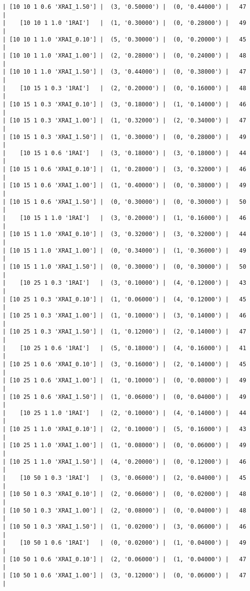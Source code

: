 \documentclass{article}
\begin{document}
\begin{verbatim}
| [10 10 1 0.6 'XRAI_1.50'] |  (3, '0.50000') |  (0, '0.44000') |   47  |
|    [10 10 1 1.0 '1RAI']   |  (1, '0.30000') |  (0, '0.28000') |   49  |
| [10 10 1 1.0 'XRAI_0.10'] |  (5, '0.30000') |  (0, '0.20000') |   45  |
| [10 10 1 1.0 'XRAI_1.00'] |  (2, '0.28000') |  (0, '0.24000') |   48  |
| [10 10 1 1.0 'XRAI_1.50'] |  (3, '0.44000') |  (0, '0.38000') |   47  |
|    [10 15 1 0.3 '1RAI']   |  (2, '0.20000') |  (0, '0.16000') |   48  |
| [10 15 1 0.3 'XRAI_0.10'] |  (3, '0.18000') |  (1, '0.14000') |   46  |
| [10 15 1 0.3 'XRAI_1.00'] |  (1, '0.32000') |  (2, '0.34000') |   47  |
| [10 15 1 0.3 'XRAI_1.50'] |  (1, '0.30000') |  (0, '0.28000') |   49  |
|    [10 15 1 0.6 '1RAI']   |  (3, '0.18000') |  (3, '0.18000') |   44  |
| [10 15 1 0.6 'XRAI_0.10'] |  (1, '0.28000') |  (3, '0.32000') |   46  |
| [10 15 1 0.6 'XRAI_1.00'] |  (1, '0.40000') |  (0, '0.38000') |   49  |
| [10 15 1 0.6 'XRAI_1.50'] |  (0, '0.30000') |  (0, '0.30000') |   50  |
|    [10 15 1 1.0 '1RAI']   |  (3, '0.20000') |  (1, '0.16000') |   46  |
| [10 15 1 1.0 'XRAI_0.10'] |  (3, '0.32000') |  (3, '0.32000') |   44  |
| [10 15 1 1.0 'XRAI_1.00'] |  (0, '0.34000') |  (1, '0.36000') |   49  |
| [10 15 1 1.0 'XRAI_1.50'] |  (0, '0.30000') |  (0, '0.30000') |   50  |
|    [10 25 1 0.3 '1RAI']   |  (3, '0.10000') |  (4, '0.12000') |   43  |
| [10 25 1 0.3 'XRAI_0.10'] |  (1, '0.06000') |  (4, '0.12000') |   45  |
| [10 25 1 0.3 'XRAI_1.00'] |  (1, '0.10000') |  (3, '0.14000') |   46  |
| [10 25 1 0.3 'XRAI_1.50'] |  (1, '0.12000') |  (2, '0.14000') |   47  |
|    [10 25 1 0.6 '1RAI']   |  (5, '0.18000') |  (4, '0.16000') |   41  |
| [10 25 1 0.6 'XRAI_0.10'] |  (3, '0.16000') |  (2, '0.14000') |   45  |
| [10 25 1 0.6 'XRAI_1.00'] |  (1, '0.10000') |  (0, '0.08000') |   49  |
| [10 25 1 0.6 'XRAI_1.50'] |  (1, '0.06000') |  (0, '0.04000') |   49  |
|    [10 25 1 1.0 '1RAI']   |  (2, '0.10000') |  (4, '0.14000') |   44  |
| [10 25 1 1.0 'XRAI_0.10'] |  (2, '0.10000') |  (5, '0.16000') |   43  |
| [10 25 1 1.0 'XRAI_1.00'] |  (1, '0.08000') |  (0, '0.06000') |   49  |
| [10 25 1 1.0 'XRAI_1.50'] |  (4, '0.20000') |  (0, '0.12000') |   46  |
|    [10 50 1 0.3 '1RAI']   |  (3, '0.06000') |  (2, '0.04000') |   45  |
| [10 50 1 0.3 'XRAI_0.10'] |  (2, '0.06000') |  (0, '0.02000') |   48  |
| [10 50 1 0.3 'XRAI_1.00'] |  (2, '0.08000') |  (0, '0.04000') |   48  |
| [10 50 1 0.3 'XRAI_1.50'] |  (1, '0.02000') |  (3, '0.06000') |   46  |
|    [10 50 1 0.6 '1RAI']   |  (0, '0.02000') |  (1, '0.04000') |   49  |
| [10 50 1 0.6 'XRAI_0.10'] |  (2, '0.06000') |  (1, '0.04000') |   47  |
| [10 50 1 0.6 'XRAI_1.00'] |  (3, '0.12000') |  (0, '0.06000') |   47  |

\end{verbatim}
\end{document}
